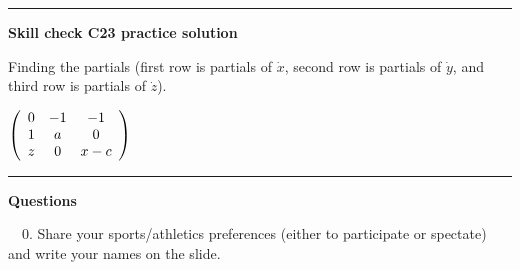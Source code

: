 \documentclass[12pt,letterpaper,noanswers]{exam}
\begin{document}
\hrule
\vspace{0.2cm}

\noindent\textbf{Skill check C23 practice solution}

Finding the partials (first row is partials of $\dot x$, second row is partials of $\dot y$, and third row is partials of $\dot z$).

$\left(\begin{array}{c c c} 0 & -1 & -1 \\ 1 & a & 0 \\ z & 0 & x-c\end{array}\right)$

\vspace{0.2cm}

\hrule
\vspace{0.2cm}
\noindent\textbf{Questions}

\noindent \ \ 0.  Share your sports/athletics preferences (either to participate or spectate) and write your names on the slide.
\end{document}
